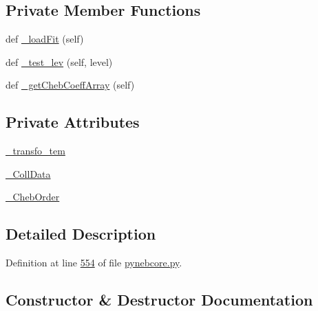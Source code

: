 \subsection*{Private Member Functions}
\begin{DoxyCompactItemize}
\item 
def \hyperlink{classpyneb_1_1core_1_1pynebcore_1_1___coll_data_fits_ad04efe1233834714042db34b1ba4508b}{\+\_\+load\+Fit} (self)
\item 
def \hyperlink{classpyneb_1_1core_1_1pynebcore_1_1___coll_data_fits_a7bc932cc0743068d924a2ac51af0b4d4}{\+\_\+test\+\_\+lev} (self, level)
\item 
def \hyperlink{classpyneb_1_1core_1_1pynebcore_1_1___coll_data_fits_afe4a86564a0306ca1a72cfccc1a66360}{\+\_\+get\+Cheb\+Coeff\+Array} (self)
\end{DoxyCompactItemize}
\subsection*{Private Attributes}
\begin{DoxyCompactItemize}
\item 
\hyperlink{classpyneb_1_1core_1_1pynebcore_1_1___coll_data_fits_afa9318fd2557709e968682f47cefa379}{\+\_\+transfo\+\_\+tem}
\item 
\hyperlink{classpyneb_1_1core_1_1pynebcore_1_1___coll_data_fits_a34f70aba84a783d1a5a8633f797f7bb1}{\+\_\+\+Coll\+Data}
\item 
\hyperlink{classpyneb_1_1core_1_1pynebcore_1_1___coll_data_fits_aeb6a6f312ca21c1e1b3aa72225a0d442}{\+\_\+\+Cheb\+Order}
\end{DoxyCompactItemize}


\subsection{Detailed Description}


Definition at line \hyperlink{pynebcore_8py_source_l00554}{554} of file \hyperlink{pynebcore_8py_source}{pynebcore.\+py}.



\subsection{Constructor \& Destructor Documentation}
\hypertarget{classpyneb_1_1core_1_1pynebcore_1_1___coll_data_fits_a34dd1c347e0328a9f282d418e14cf653}{}
